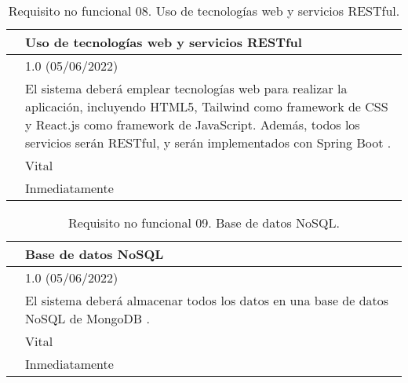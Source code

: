 \begin{table}[H]
\begin{center}
\begin{tabular}{|p{3cm}|p{10cm}|} \hline
\centering {\bf NFR-08} & Uso de tecnologías web y servicios RESTful  \\ \hline\hline
\centering {\bf Versión} & 1.0 (05/06/2022) \\ \hline
\centering {\bf Descripción} & El sistema deberá emplear tecnologías web para realizar la aplicación, incluyendo HTML5, Tailwind \cite{tailwind} como framework de CSS y React.js \cite{react} como framework de JavaScript. Además, todos los servicios serán RESTful, y serán implementados con Spring Boot \cite{spring}. \\ \hline
\centering {\bf Importancia} & Vital \\ \hline
\centering {\bf Urgencia} & Inmediatamente \\ \hline
\end{tabular}
\caption{Requisito no funcional 08. Uso de tecnologías web y servicios RESTful.}
\label{enlaceNFR8}
\end{center}
\end{table}

\begin{table}[H]
\begin{center}
\begin{tabular}{|p{3cm}|p{10cm}|} \hline
\centering {\bf NFR-09} & Base de datos NoSQL  \\ \hline\hline
\centering {\bf Versión} & 1.0 (05/06/2022) \\ \hline
\centering {\bf Descripción} & El sistema deberá almacenar todos los datos en una base de datos NoSQL de MongoDB \cite{mongodb}. \\ \hline
\centering {\bf Importancia} & Vital \\ \hline
\centering {\bf Urgencia} & Inmediatamente \\ \hline
\end{tabular}
\caption{Requisito no funcional 09. Base de datos NoSQL.}
\label{enlaceNFR9}
\end{center}
\end{table}

